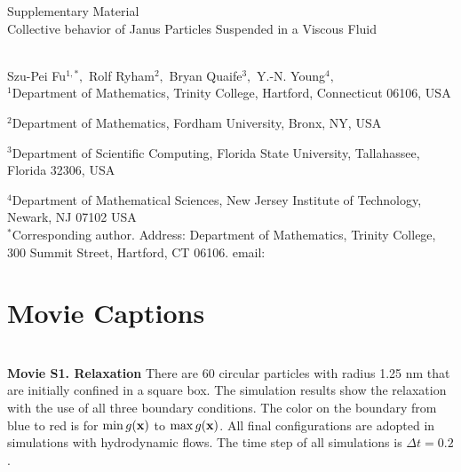 
\thispagestyle{empty}

\newpage
{\Large \bf

  \noindent Supplementary Material\\

  \noindent 
  Collective behavior of Janus Particles  Suspended in a Viscous Fluid}\\

\noindent 
Szu-Pei Fu$^{1,*},$ 
Rolf Ryham$^{2},$ 
Bryan Quaife$^{3},$ 
Y.-N. Young$^{4},$
\\

\noindent
$^{1}$Department of Mathematics, Trinity College, Hartford, Connecticut 06106, USA

\noindent
$^{2}$Department of Mathematics, Fordham University,  Bronx, NY, USA

\noindent
$^{3}$Department of Scientific Computing, Florida State University, Tallahassee, Florida 32306, USA

\noindent
$^{4}$Department of Mathematical Sciences, New Jersey Institute of Technology, Newark, NJ  07102 USA
\\

\noindent $^*$Corresponding author. Address: Department of Mathematics, Trinity College, 
300 Summit Street, Hartford, CT 06106. email: 



\setcounter{page}{1}

\setcounter{figure}{0}
\renewcommand{\thefigure}{S\arabic{figure}}

\setcounter{equation}{0}
\renewcommand{\theequation}{S\arabic{equation}}

\setcounter{section}{0}
\renewcommand{\thesection}{S\arabic{section}}   





\sloppy
\section{Movie Captions}\mbox{} \\

\noindent
{\bf Movie S1. Relaxation} 
There are 60 circular particles with radius 1.25 nm that are initially confined in a square box.
The simulation results show the relaxation with the use of all three boundary conditions.
The color on the boundary from blue to red
is for $\min g(\mathbf{x})$ to $\max g(\mathbf{x})$.
All final configurations are adopted in 
simulations with hydrodynamic flows.
The time step of all simulations is $\Delta t=0.2$.\\


